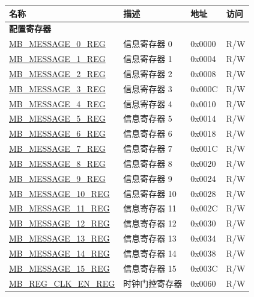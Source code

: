 \begin{longtable}{ | p{6cm} | p{7.2cm} | p{1.3cm} | p{1cm} | }
\hline\rowcolor{lightgray}
\textbf{名称} & \textbf{描述} &  \textbf{地址} & \textbf{访问} \\ \hline
\endhead
\multicolumn{4}{|l|}{\textbf{配置寄存器}} \\ \hline
\hyperref[regdesc:MBMESSAGE0REG]{MB\_MESSAGE\_0\_REG} & 信息寄存器 0& 0x0000 & R/W \\ \hline
\hyperref[regdesc:MBMESSAGE1REG]{MB\_MESSAGE\_1\_REG} & 信息寄存器 1& 0x0004 & R/W \\ \hline
\hyperref[regdesc:MBMESSAGE2REG]{MB\_MESSAGE\_2\_REG} & 信息寄存器 2& 0x0008 & R/W \\ \hline
\hyperref[regdesc:MBMESSAGE3REG]{MB\_MESSAGE\_3\_REG} & 信息寄存器 3& 0x000C & R/W \\ \hline
\hyperref[regdesc:MBMESSAGE4REG]{MB\_MESSAGE\_4\_REG} & 信息寄存器 4& 0x0010 & R/W \\ \hline
\hyperref[regdesc:MBMESSAGE5REG]{MB\_MESSAGE\_5\_REG} & 信息寄存器 5& 0x0014 & R/W \\ \hline
\hyperref[regdesc:MBMESSAGE6REG]{MB\_MESSAGE\_6\_REG} & 信息寄存器 6& 0x0018 & R/W \\ \hline
\hyperref[regdesc:MBMESSAGE7REG]{MB\_MESSAGE\_7\_REG} & 信息寄存器 7& 0x001C & R/W \\ \hline
\hyperref[regdesc:MBMESSAGE8REG]{MB\_MESSAGE\_8\_REG} & 信息寄存器 8& 0x0020 & R/W \\ \hline
\hyperref[regdesc:MBMESSAGE9REG]{MB\_MESSAGE\_9\_REG} & 信息寄存器 9& 0x0024 & R/W \\ \hline
\hyperref[regdesc:MBMESSAGE10REG]{MB\_MESSAGE\_10\_REG} & 信息寄存器 10& 0x0028 & R/W \\ \hline
\hyperref[regdesc:MBMESSAGE11REG]{MB\_MESSAGE\_11\_REG} & 信息寄存器 11& 0x002C & R/W \\ \hline
\hyperref[regdesc:MBMESSAGE12REG]{MB\_MESSAGE\_12\_REG} & 信息寄存器 12& 0x0030 & R/W \\ \hline
\hyperref[regdesc:MBMESSAGE13REG]{MB\_MESSAGE\_13\_REG} & 信息寄存器 13& 0x0034 & R/W \\ \hline
\hyperref[regdesc:MBMESSAGE14REG]{MB\_MESSAGE\_14\_REG} & 信息寄存器 14& 0x0038 & R/W \\ \hline
\hyperref[regdesc:MBMESSAGE15REG]{MB\_MESSAGE\_15\_REG} & 信息寄存器 15& 0x003C & R/W \\ \hline
\hyperref[regdesc:MBREGCLKENREG]{MB\_REG\_CLK\_EN\_REG} & 时钟门控寄存器 & 0x0060 & R/W \\ \hline

\end{longtable}
